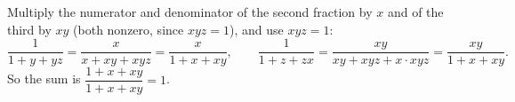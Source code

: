 Multiply the numerator and denominator of the second fraction by $x$ and of the third by $xy$ (both nonzero, since $xyz=1$), and use $xyz=1$:
\[
\dfrac{1}{1+y+yz}=\dfrac{x}{x+xy+xyz}=\dfrac{x}{1+x+xy},\qquad \dfrac{1}{1+z+zx}=\dfrac{xy}{xy+xyz+x\cdot xyz}=\dfrac{xy}{1+x+xy}.
\]
So the sum is $\dfrac{1+x+xy}{1+x+xy}=\boxed{1}$.
